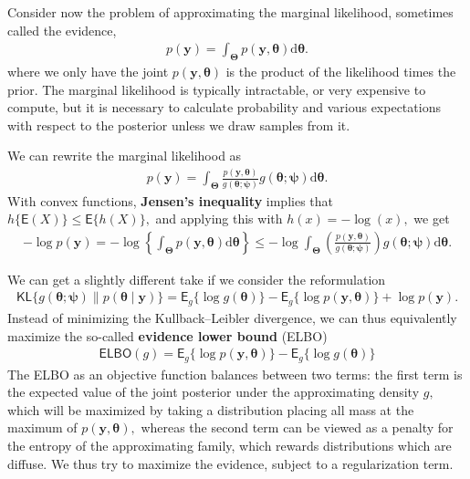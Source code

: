 \documentclass[
  11pt,
  letterpaper,
]{scrbook}
\theoremstyle{plain}
\theoremstyle{plain}
\theoremstyle{definition}
\theoremstyle{definition}
\theoremstyle{definition}
\theoremstyle{plain}
\theoremstyle{remark}
\begin{document}
Consider now the problem of approximating the marginal likelihood,
sometimes called the evidence, \begin{align*}
p(\boldsymbol{y}) = \int_{\boldsymbol{\Theta}} p(\boldsymbol{y}, \boldsymbol{\theta}) \mathrm{d} \boldsymbol{\theta}.
\end{align*} where we only have the joint
\(p(\boldsymbol{y}, \boldsymbol{\theta})\) is the product of the
likelihood times the prior. The marginal likelihood is typically
intractable, or very expensive to compute, but it is necessary to
calculate probability and various expectations with respect to the
posterior unless we draw samples from it.

We can rewrite the marginal likelihood as \begin{align*}
p(\boldsymbol{y}) = \int_{\boldsymbol{\Theta}}  \frac{p(\boldsymbol{y}, \boldsymbol{\theta})}{g(\boldsymbol{\theta};\boldsymbol{\psi})} g(\boldsymbol{\theta};\boldsymbol{\psi}) \mathrm{d} \boldsymbol{\theta}.
\end{align*} With convex functions, \textbf{Jensen's inequality} implies
that \(h\{\mathsf{E}(X)\} \leq \mathsf{E}\{h(X)\},\) and applying this
with \(h(x)=-\log(x),\) we get \begin{align*}
-\log p(\boldsymbol{y})  = -\log \left\{\int_{\boldsymbol{\Theta}} p(\boldsymbol{y}, \boldsymbol{\theta}) \mathrm{d} \boldsymbol{\theta}\right\} \leq - \log  \int_{\boldsymbol{\Theta}} \left(\frac{p(\boldsymbol{y}, \boldsymbol{\theta})}{g(\boldsymbol{\theta};\boldsymbol{\psi})}\right) g(\boldsymbol{\theta};\boldsymbol{\psi}) \mathrm{d} \boldsymbol{\theta}.
\end{align*}

We can get a slightly different take if we consider the reformulation
\begin{align*}
\mathsf{KL}\{g(\boldsymbol{\theta};\boldsymbol{\psi}) \parallel p(\boldsymbol{\theta} \mid \boldsymbol{y})\} = \mathsf{E}_{g}\{\log g(\boldsymbol{\theta})\} - \mathsf{E}_g\{\log p(\boldsymbol{y}, \boldsymbol{\theta})\} + \log p(\boldsymbol{y}).
\end{align*} Instead of minimizing the Kullback--Leibler divergence, we
can thus equivalently maximize the so-called \textbf{evidence lower
bound} (ELBO) \begin{align*}
\mathsf{ELBO}(g) = \mathsf{E}_g\{\log p(\boldsymbol{y}, \boldsymbol{\theta})\} - \mathsf{E}_{g}\{\log g(\boldsymbol{\theta})\}
\end{align*} The ELBO as an objective function balances between two
terms: the first term is the expected value of the joint posterior under
the approximating density \(g,\) which will be maximized by taking a
distribution placing all mass at the maximum of
\(p(\boldsymbol{y}, \boldsymbol{\theta}),\) whereas the second term can
be viewed as a penalty for the entropy of the approximating family,
which rewards distributions which are diffuse. We thus try to maximize
the evidence, subject to a regularization term.
\end{document}
